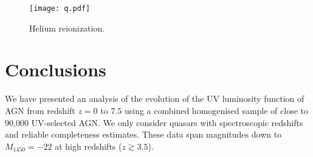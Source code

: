 \documentclass[a4paper,fleqn,usenatbib]{mnras}
\begin{document}
\begin{figure}
  \begin{center}
    \texttt{[image: q.pdf]}
  \end{center}
  \caption{Helium reionization.}
\end{figure}

\section{Conclusions}

We have presented an analysis of the evolution of the UV luminosity
function of AGN from redshift $z=0$ to $7.5$ using a combined
homogenised sample of close to 90,000 UV-selected AGN.  We only
consider quasars with spectroscopic redshifts and reliable
completeness estimates.  These data span magnitudes down to
$M_{1450}=-22$ at high redshifts ($z\gtrsim 3.5$).
\end{document}
